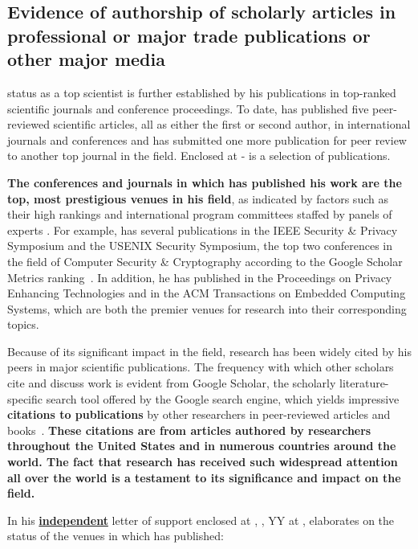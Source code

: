 \subsection{Evidence of \drs authorship of scholarly articles in 
	professional or major trade publications or other major media}
\label{sec:authorship}
	
\drs status as a top scientist is further established by his publications in
top-ranked scientific journals and conference proceedings.
To date, \dr has published five peer-reviewed scientific articles, all as
either the first or second author, in international journals and conferences
and has submitted one more publication for peer review to another top journal in
the field.
Enclosed at - is a selection of
\drs publications.

\textbf{The conferences and journals in which \dr has published his work are the
top, most prestigious venues in his field}, as indicated by factors such as
their high rankings and international program committees staffed by panels of
experts \cite[Metrics of the journals and conferences in which \dr has
published]{venues}.
For example, \dr has several publications in the IEEE Security \& Privacy
Symposium and the USENIX Security Symposium, the top two conferences in the
field of Computer Security \& Cryptography according to the Google
Scholar Metrics ranking~\cite{venues}.
In addition, he has published in the Proceedings on Privacy Enhancing
Technologies and in the ACM Transactions on Embedded Computing Systems, which
are both the premier venues for research into their corresponding topics.

Because of its significant impact in the field, \drs research has been widely
cited by his peers in major scientific publications.
The frequency with which other scholars cite and discuss \drs work is evident
from Google Scholar, the scholarly literature-specific search tool offered by
the Google search engine, which yields impressive \textbf{\numcitations
citations to \drs publications} by other researchers in peer-reviewed articles
and books~\cite[Evidence of the total number of citations
to \drs publications]{gscholar}.
\textbf{These citations are from articles authored by researchers throughout the
United States and in numerous countries around the world.
The fact that \drs research has received such widespread attention all over the
world is a testament to its significance and impact on the field.}

In his \textbf{\uline{independent}} letter of support enclosed at
, \ddd, YY at \yellowuni,
elaborates on the status of the venues in which \dr has published:


